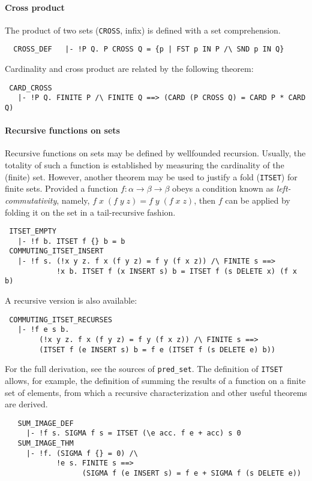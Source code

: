 \paragraph{Cross product}
The product of two sets ({\small\verb+CROSS+}, infix) is defined
with a set comprehension.
%
{\small
\begin{verbatim}
  CROSS_DEF   |- !P Q. P CROSS Q = {p | FST p IN P /\ SND p IN Q}
\end{verbatim}
}
%
\noindent Cardinality and cross product are related by the following theorem:
{\small
\begin{verbatim}
 CARD_CROSS
   |- !P Q. FINITE P /\ FINITE Q ==> (CARD (P CROSS Q) = CARD P * CARD Q)
\end{verbatim}
}
%
\paragraph{Recursive functions on sets}

Recursive functions on sets may be defined by wellfounded
recursion. Usually, the totality of such a function is established by
measuring the cardinality of the (finite) set. However, another
theorem may be used to justify a fold ({\small\verb+ITSET+}) for finite sets.
Provided a function $f:\alpha\to\beta\to\beta$ obeys a condition
known as \emph{left-commutativity}, namely, $f\;x\;(f\;y\;z) =
f\;y\;(f\;x\;z)$, then $f$ can be applied by folding it on the set
in a tail-recursive fashion.
%
{\small
\begin{verbatim}
 ITSET_EMPTY
   |- !f b. ITSET f {} b = b
 COMMUTING_ITSET_INSERT
   |- !f s. (!x y z. f x (f y z) = f y (f x z)) /\ FINITE s ==>
            !x b. ITSET f (x INSERT s) b = ITSET f (s DELETE x) (f x b)
\end{verbatim}
}
%
\noindent A recursive version is also available:
{\small
\begin{verbatim}
 COMMUTING_ITSET_RECURSES
   |- !f e s b.
        (!x y z. f x (f y z) = f y (f x z)) /\ FINITE s ==>
        (ITSET f (e INSERT s) b = f e (ITSET f (s DELETE e) b))
\end{verbatim}
}
%
For the full derivation, see the sources of {\small\verb+pred_set+}.
The definition of {\small\verb+ITSET+} allows, for example, the
definition of summing the results of a function on a finite set of elements,
from which a recursive characterization and other useful theorems are derived.
%
{\small
\begin{verbatim}
   SUM_IMAGE_DEF
     |- !f s. SIGMA f s = ITSET (\e acc. f e + acc) s 0
   SUM_IMAGE_THM
     |- !f. (SIGMA f {} = 0) /\
            !e s. FINITE s ==>
                  (SIGMA f (e INSERT s) = f e + SIGMA f (s DELETE e))
\end{verbatim}
}

